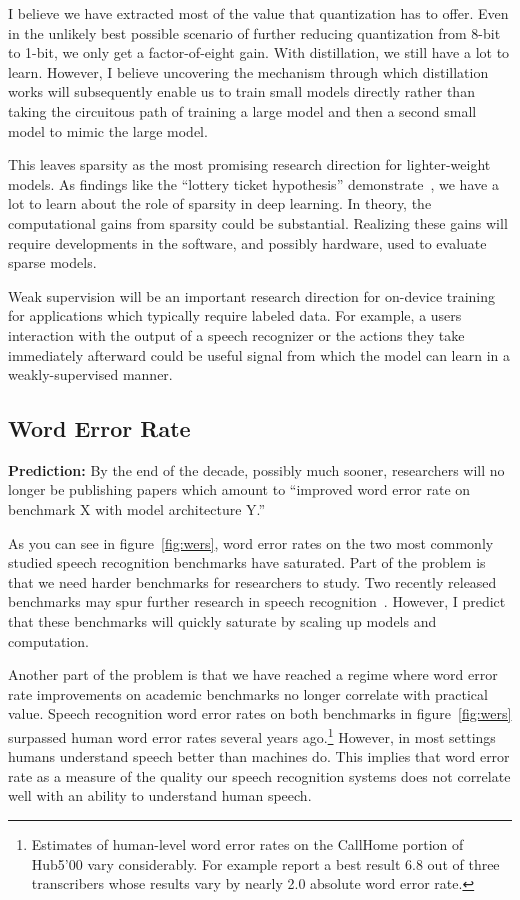 I believe we have extracted most of the value that quantization has to offer.
Even in the unlikely best possible scenario of further reducing quantization
from 8-bit to 1-bit, we only get a factor-of-eight gain. With distillation, we
still have a lot to learn. However, I believe uncovering the mechanism through
which distillation works will subsequently enable us to train small models
directly rather than taking the circuitous path of training a large model and
then a second small model to mimic the large model.

This leaves sparsity as the most promising research direction for
lighter-weight models. As findings like the ``lottery ticket hypothesis''
demonstrate~\citep{frankle2018lottery}, we have a lot to learn about the role
of sparsity in deep learning. In theory, the computational gains from sparsity
could be substantial. Realizing these gains will require developments in the
software, and possibly hardware, used to evaluate sparse models.

Weak supervision will be an important research direction for on-device training
for applications which typically require labeled data. For example, a users
interaction with the output of a speech recognizer or the actions they take
immediately afterward could be useful signal from which the model can learn in
a weakly-supervised manner.

\subsection{Word Error Rate}
\label{sec:wer}

{\bf Prediction:} By the end of the decade, possibly much sooner, researchers
will no longer be publishing papers which amount to ``improved word error rate
on benchmark X with model architecture Y.''

As you can see in figure~\ref{fig:wers}, word error rates on the two most
commonly studied speech recognition benchmarks have saturated. Part of the
problem is that we need harder benchmarks for researchers to study.  Two
recently released benchmarks may spur further research in speech
recognition~\citep{chen2021gigaspeech, galvez2021people}. However, I predict
that these benchmarks will quickly saturate by scaling up models and
computation.

Another part of the problem is that we have reached a regime where word error
rate improvements on academic benchmarks no longer correlate with practical
value. Speech recognition word error rates on both benchmarks in
figure~\ref{fig:wers} surpassed human word error rates several years
ago.\footnote{Estimates of human-level word error rates on the CallHome portion
of Hub5'00 vary considerably. For example \citet{saon2017english} report a best
result 6.8 out of three transcribers whose results vary by nearly 2.0 absolute
word error rate.} However, in most settings humans understand speech better
than machines do. This implies that word error rate as a measure of the quality
our speech recognition systems does not correlate well with an ability to
understand human speech.

